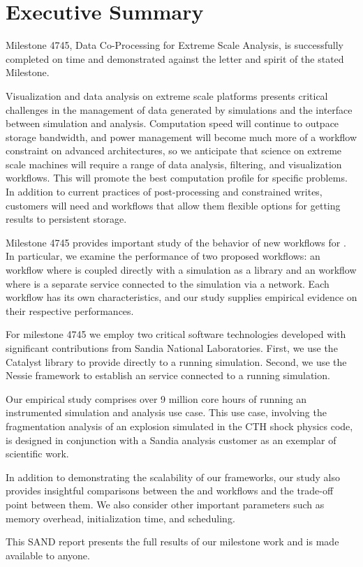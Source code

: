 \section*{Executive Summary}

Milestone 4745, Data Co-Processing for Extreme Scale Analysis, is
successfully completed on time and demonstrated against the letter and
spirit of the stated Milestone.

Visualization and data analysis on extreme scale platforms presents
critical challenges in the management of data generated by simulations and
the interface between simulation and analysis.  Computation speed will continue
to outpace storage bandwidth, and power management will become much more of
a workflow constraint on advanced architectures, so we anticipate that 
science on extreme scale 
machines will require a range of data analysis, filtering, and visualization
workflows.  This will promote the best computation profile for specific 
problems.  In addition to current practices of post-processing and 
constrained writes, customers will need \insitu and \intransit workflows that
allow them flexible options for getting results to persistent storage.

Milestone 4745 provides important study of the behavior of new workflows
for \vda.  In particular, we examine the performance of two proposed
workflows: an \insitu workflow where \vda is coupled directly with a
simulation as a library and an \intransit workflow where \vda is a separate
service connected to the simulation via a network.  Each workflow has its
own characteristics, and our study supplies empirical evidence on their
respective performances.

For milestone 4745 we employ two critical software technologies developed
with significant contributions from Sandia National Laboratories.  First,
we use the Catalyst library to provide \insitu \vda directly to a running
simulation.  Second, we use the Nessie framework to establish an \intransit
\vda service connected to a running simulation.

Our empirical study comprises over 9 million core hours of running an
instrumented simulation and analysis use case.  This use case, involving
the fragmentation analysis of an explosion simulated in the CTH shock
physics code, is designed in conjunction with a Sandia analysis customer as
an exemplar of scientific work.

In addition to demonstrating the scalability of our frameworks, our study
also provides insightful comparisons between the \insitu and \intransit
workflows and the trade-off point between them.  We also consider other
important parameters such as memory overhead, initialization time, and
scheduling.

This SAND report presents the full results of our milestone work and is
made available to anyone.
